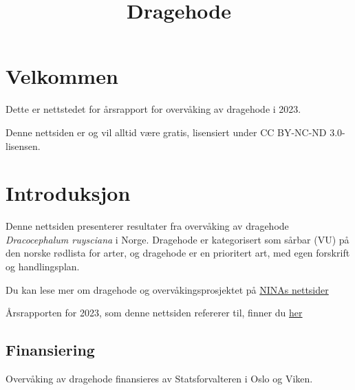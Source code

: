 \documentclass[
  letterpaper,
  DIV=11,
  numbers=noendperiod]{scrreport}
\title{Dragehode}
\author{}
\date{}
\renewcommand*\contentsname{Table of contents}
\newcommand\contentsname{Table of contents}
\begin{document}
\maketitle
\ifdefined\Shaded\renewenvironment{Shaded}{\begin{tcolorbox}[borderline west={3pt}{0pt}{shadecolor}, interior hidden, sharp corners, enhanced, frame hidden, boxrule=0pt, breakable]}{\end{tcolorbox}}\fi

\renewcommand*\contentsname{Table of contents}
{
\hypersetup{linkcolor=}
\setcounter{tocdepth}{2}
\tableofcontents
}

\hypertarget{velkommen}{%
\chapter*{Velkommen}\label{velkommen}}


Dette er nettstedet for årsrapport for overvåking av dragehode i 2023.

Denne nettsiden er og vil alltid være gratis, lisensiert under CC
BY-NC-ND 3.0-lisensen.


\hypertarget{sec-intro}{%
\chapter{Introduksjon}\label{sec-intro}}

Denne nettsiden presenterer resultater fra overvåking av dragehode
\emph{Dracocephalum ruysciana} i Norge. Dragehode er kategorisert som
sårbar (VU) på den norske rødlista for arter, og dragehode er en
prioritert art, med egen forskrift og handlingsplan.

Du kan lese mer om dragehode og overvåkingsprosjektet på
\href{https://www.nina.no/Naturmangfold/Trua-natur/Dragehode}{NINAs
nettsider}

Årsrapporten for 2023, som denne nettsiden refererer til, finner du
\href{https://brage.nina.no/nina-xmlui/handle/11250/3052108}{her}

\hypertarget{finansiering}{%
\section{Finansiering}\label{finansiering}}

Overvåking av dragehode finansieres av Statsforvalteren i Oslo og Viken.
\end{document}
